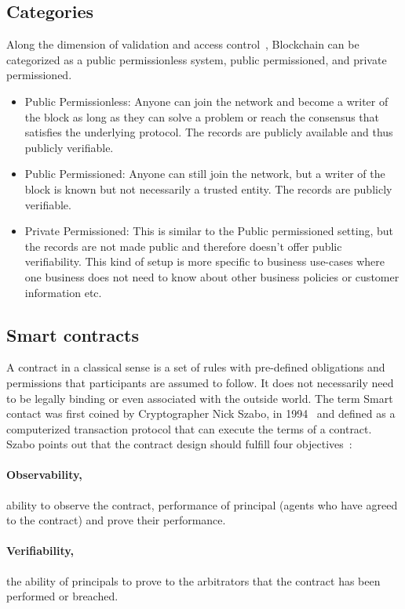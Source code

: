 \subsection{Categories}
Along the dimension of validation and access control~\cite{voronchenko2017you},
Blockchain can be categorized as a public permissionless system, public
permissioned, and private permissioned. 
\begin{itemize}
	\item Public Permissionless: Anyone can join the network and become a writer
		of the block as long as they can solve a problem or reach the consensus
		that satisfies the underlying protocol. The records are publicly
		available and thus publicly verifiable. 
	\item Public Permissioned: Anyone can still join the network, but a writer
		of the block is known but not necessarily a trusted entity. The records
		are publicly verifiable. 
	\item Private Permissioned: This is similar to the Public permissioned
		setting, but the records are not made public and therefore doesn't
		offer public verifiability. This kind of setup is more specific to
		business use-cases where one business does not need to know about other
		business policies or customer information etc. 
\end{itemize}
\subsection{Smart contracts}
A contract in a classical sense is a set of rules with pre-defined obligations
and permissions that participants are assumed to follow. It does not
necessarily need to be legally binding or even associated with the outside
world. The term Smart contact was first coined by Cryptographer Nick Szabo, in
1994~\cite{SzaboSmart1994} and defined as a computerized transaction protocol
that can execute the terms of a contract. Szabo points out that the contract
design should fulfill four objectives~\cite{szabo1996smart}: 
\paragraph{Observability,}ability to observe the contract, performance of
principal (agents who have agreed to the contract) and prove their
performance.
\paragraph{Verifiability,}the ability of principals to prove to the arbitrators
that the contract has been performed or breached.  

